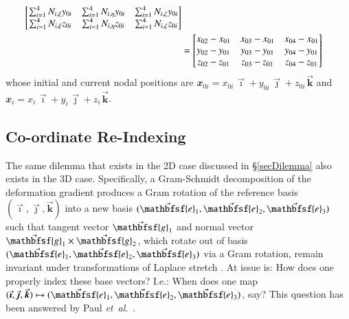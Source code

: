 \begin{subequations}
\begin{align}
\begin{bmatrix}
    \sum_{i=1}^4 N_{i,\xi} y_{0i} & \sum_{i=1}^4 N_{i,\eta} y_{0i} & \sum_{i=1}^4 N_{i,\zeta} y_{0i} \\
    \sum_{i=1}^4 N_{i,\xi} z_{0i} & \sum_{i=1}^4 N_{i,\eta} z_{0i} & \sum_{i=1}^4 N_{i,\zeta} z_{0i}
    \end{bmatrix} \notag \\
    & = \begin{bmatrix}
    x_{02} - x_{01} & x_{03} - x_{01} & x_{04} - x_{01} \\
    y_{02} - y_{01} & y_{03} - y_{01} & y_{04} - y_{01} \\
    z_{02} - z_{01} & z_{03} - z_{01} & z_{04} - z_{01}
    \end{bmatrix}
    \end{align}
\end{subequations}
whose initial and current nodal positions are $\mathbfit{x}_{0i} = x_{0i\,} \vec{\boldsymbol{\imath}} + y_{0i\,} \vec{\boldsymbol{\jmath}} + z_{0i\,} \vec{\boldsymbol{k}}$ and $\mathbfit{x}_{i} = x_{i\,} \vec{\boldsymbol{\imath}} + y_{i\,} \vec{\boldsymbol{\jmath}} + z_{i\,} \vec{\boldsymbol{k}}$.

\subsection{Co-ordinate Re-Indexing}
\label{reindexing3D}

The same dilemma that exists in the 2D case discussed in \S\ref{secDilemma} also exists in the 3D case.  Specifically, a Gram-Schmidt decomposition of the deformation gradient produces a Gram rotation of the reference basis $( \vec{\boldsymbol{\imath}} , \vec{\boldsymbol{\jmath}} , \vec{\boldsymbol{k}} )$ into a new basis $( \vec{\mathbfsf{e}}_1 , \vec{\mathbfsf{e}}_2 , \vec{\mathbfsf{e}}_3 )$ such that tangent vector $\vec{\mathbfsf{g}}_1$ and normal vector $\vec{\mathbfsf{g}}_1 \times \vec{\mathbfsf{g}}_2$, which rotate out of basis $( \vec{\mathbfsf{e}}_1 , \vec{\mathbfsf{e}}_2 , \vec{\mathbfsf{e}}_3 )$ via a Gram rotation, remain invariant under transformations of Laplace stretch \cite{McLellan80}.  At issue is: How does one properly index these base vectors? I.e.: When does one map $( \vec{\boldsymbol{\imath}} , \vec{\boldsymbol{\jmath}} ,  \vec{\boldsymbol{k}} ) \mapsto ( \vec{\mathbfsf{e}}_1 ,  \vec{\mathbfsf{e}}_2 ,  \vec{\mathbfsf{e}}_3 )$, say?  This question has been answered by Paul \textit{et~al}.~\cite{Pauletal20}.

